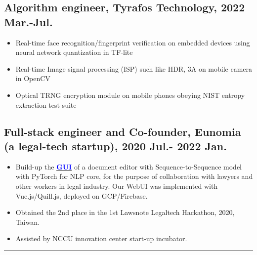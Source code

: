 \begin{experiencebox}
\vspace{0.3em}

\subsection*{\textbf{Algorithm engineer}, Tyrafos Technology, 2022 Mar.-Jul.}
\begin{itemize}[noitemsep]
    \item Real-time face recognition/fingerprint verification on embedded devices using neural network quantization in TF-lite
    \item Real-time Image signal processing (ISP) such like HDR, 3A on mobile camera in OpenCV
    \item Optical TRNG encryption module on mobile phones obeying NIST entropy extraction test suite
\end{itemize}

\vspace{0.3em}

\subsection*{Full-stack engineer and Co-founder, Eunomia (a legal-tech startup), 2020 Jul.- 2022 Jan.}
\begin{itemize}[noitemsep]
    \item Build-up the \href{https://github.com/Kuo-TingKai/Eunomia}{\textbf{\textcolor{blue}{GUI}}} of a document editor with Sequence-to-Sequence model with PyTorch for NLP core, for the purpose of collaboration with lawyers and other workers in legal industry. Our WebUI was implemented with Vue.js/Quill.js, deployed on GCP/Firebase.
    \item Obtained the 2nd place in the 1st Lawsnote Legaltech Hackathon, 2020, Taiwan.
    \item Assisted by NCCU innovation center start-up incubator.
\end{itemize}
\end{experiencebox}

\hrule

